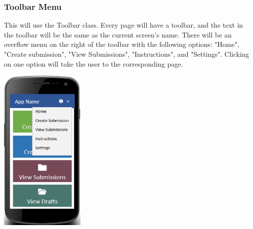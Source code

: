 \documentclass[onecolumn, draftclsnofoot,10pt, compsoc]{IEEEtran}
\begin{document}
\subsubsection{Toolbar Menu}
This will use the Toolbar class. Every page will have a toolbar, and the text in the toolbar will be the same as the current screen's name. There will be an overflow menu on the right of the toolbar with the following options: "Home", "Create submission", "View Submissions", "Instructions", and "Settings". Clicking on one option will take the user to the corresponding page. 
\newline
\begin{center}
\includegraphics[height=8cm]{menuscreen.png}
\end{center}
\end{document}
